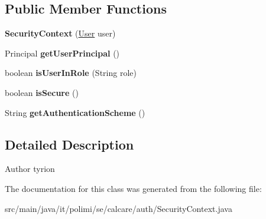 \subsection*{Public Member Functions}
\begin{DoxyCompactItemize}
\item 
\hypertarget{classit_1_1polimi_1_1se_1_1calcare_1_1auth_1_1SecurityContext_ac550381ff255793aac3080ec0f4b8935}{}{\bfseries Security\+Context} (\hyperlink{classit_1_1polimi_1_1se_1_1calcare_1_1entities_1_1User}{User} user)\label{classit_1_1polimi_1_1se_1_1calcare_1_1auth_1_1SecurityContext_ac550381ff255793aac3080ec0f4b8935}

\item 
\hypertarget{classit_1_1polimi_1_1se_1_1calcare_1_1auth_1_1SecurityContext_a8db291c84bb2972b8b5bd115fe745f25}{}Principal {\bfseries get\+User\+Principal} ()\label{classit_1_1polimi_1_1se_1_1calcare_1_1auth_1_1SecurityContext_a8db291c84bb2972b8b5bd115fe745f25}

\item 
\hypertarget{classit_1_1polimi_1_1se_1_1calcare_1_1auth_1_1SecurityContext_a20e2a14403001d4b81974326ccfc02e7}{}boolean {\bfseries is\+User\+In\+Role} (String role)\label{classit_1_1polimi_1_1se_1_1calcare_1_1auth_1_1SecurityContext_a20e2a14403001d4b81974326ccfc02e7}

\item 
\hypertarget{classit_1_1polimi_1_1se_1_1calcare_1_1auth_1_1SecurityContext_aae76dfe134788a1f72e85a15bf9d2dd0}{}boolean {\bfseries is\+Secure} ()\label{classit_1_1polimi_1_1se_1_1calcare_1_1auth_1_1SecurityContext_aae76dfe134788a1f72e85a15bf9d2dd0}

\item 
\hypertarget{classit_1_1polimi_1_1se_1_1calcare_1_1auth_1_1SecurityContext_a6008e031210ed2b659f42e1b0a5ee7e0}{}String {\bfseries get\+Authentication\+Scheme} ()\label{classit_1_1polimi_1_1se_1_1calcare_1_1auth_1_1SecurityContext_a6008e031210ed2b659f42e1b0a5ee7e0}

\end{DoxyCompactItemize}


\subsection{Detailed Description}
\begin{DoxyAuthor}{Author}
tyrion 
\end{DoxyAuthor}


The documentation for this class was generated from the following file\+:\begin{DoxyCompactItemize}
\item 
src/main/java/it/polimi/se/calcare/auth/Security\+Context.\+java\end{DoxyCompactItemize}
